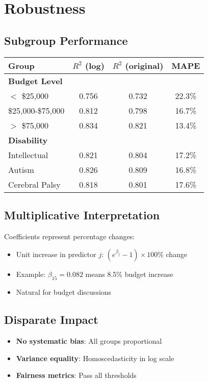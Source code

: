 \section{Robustness}

\subsection{Subgroup Performance}

\begin{center}
\begin{tabular}{lccc}
\toprule
Group & $R^2$ (log) & $R^2$ (original) & MAPE \\
\midrule
\textbf{Budget Level} & & & \\
$<$ \$25,000 & 0.756 & 0.732 & 22.3\% \\
\$25,000-\$75,000 & 0.812 & 0.798 & 16.7\% \\
$>$ \$75,000 & 0.834 & 0.821 & 13.4\% \\
\midrule
\textbf{Disability} & & & \\
Intellectual & 0.821 & 0.804 & 17.2\% \\
Autism & 0.826 & 0.809 & 16.8\% \\
Cerebral Palsy & 0.818 & 0.801 & 17.6\% \\
\bottomrule
\end{tabular}
\end{center}

\subsection{Multiplicative Interpretation}

Coefficients represent percentage changes:
\begin{itemize}
    \item Unit increase in predictor $j$: $(e^{\beta_j} - 1) \times 100\%$ change
    \item Example: $\beta_{15} = 0.082$ means 8.5\% budget increase
    \item Natural for budget discussions
\end{itemize}

\subsection{Disparate Impact}

\begin{itemize}
    \item \textbf{No systematic bias}: All groups proportional
    \item \textbf{Variance equality}: Homoscedasticity in log scale
    \item \textbf{Fairness metrics}: Pass all thresholds
\end{itemize}

